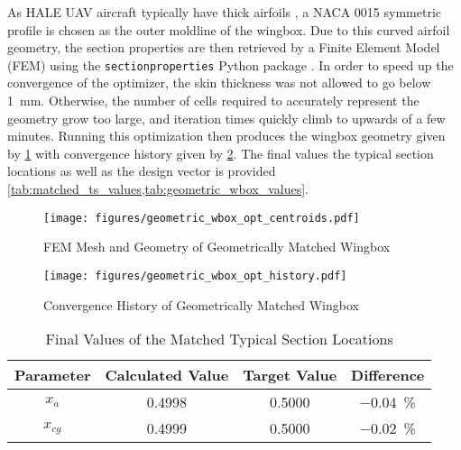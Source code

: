 As HALE UAV aircraft typically have thick airfoils
\autocite{hallissyHighfidelityAeroelasticAnalysis2011}, a NACA 0015 symmetric
profile is chosen as the outer moldline of the wingbox. Due to this curved
airfoil geometry, the section properties are then retrieved by a Finite Element
Model (FEM) using the \texttt{sectionproperties} Python package
\autocite{vanleeuwenSectionproperties}. In order to speed up the convergence of
the optimizer, the skin thickness was not allowed to go below
\SI{1}{\milli\meter}. Otherwise, the number of cells required to accurately
represent the geometry grow too large, and iteration times quickly climb to
upwards of a few minutes. Running this optimization then produces the wingbox
geometry given by \cref{fig:geometric_wingbox_geom} with convergence history
given by \cref{fig:geometric_wingbox_hist}. The final values the typical
section locations as well as the design vector is provided
\cref{tab:matched_ts_values,tab:geometric_wbox_values}.

\begin{figure}[H]
    \centering
    \texttt{[image: figures/geometric\_wbox\_opt\_centroids.pdf]}
    \caption{FEM Mesh and Geometry of Geometrically Matched Wingbox}
    \label{fig:geometric_wingbox_geom}
\end{figure}

\begin{figure}[H]
    \centering
    \texttt{[image: figures/geometric\_wbox\_opt\_history.pdf]}
    \caption{Convergence History of Geometrically Matched Wingbox}
    \label{fig:geometric_wingbox_hist}
\end{figure}

\begin{table}[H]
    \centering
    \caption{Final Values of the Matched Typical Section Locations}
    \label{tab:matched_ts_values}
    \begin{tabularx}{\textwidth}{CCCC} %
    \toprule
    \textbf{Parameter} & \textbf{Calculated Value} & \textbf{Target Value}
    & \textbf{Difference} \\
    \midrule
    $x_a$ & 0.4998 & 0.5000 & \SI{-0.04}{\percent}\\
    $x_{cg}$ & 0.4999 & 0.5000 & \SI{-0.02}{\percent}\\ \bottomrule
    \end{tabularx}
\end{table}

